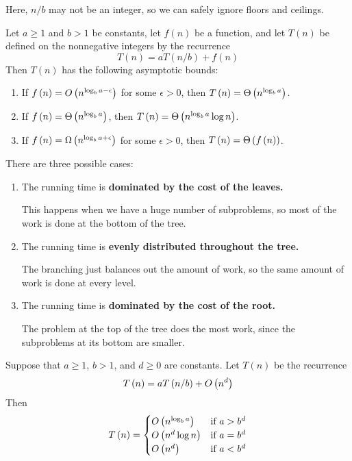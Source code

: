 Here, $n/b$ may not be an integer, so we can safely ignore floors and ceilings.

\begin{theorem}
Let $a \ge 1$ and $b>1$ be constants, let $f\left(n\right)$ be a function, and let $T\left(n\right)$ be defined on the nonnegative integers by the recurrence
\[
    T\left(n\right) = a T\left(n/b\right) + f\left(n\right)
\]
Then $T\left(n\right)$ has the following asymptotic bounds:
\begin{enumerate}
    \item If $f\left(n\right) = O\left(n^{\log_b a - \epsilon} \right)$ for some $\epsilon > 0$, then $T\left(n\right) = \Theta\left(n^{\log_b a} \right)$.
    \item If $f\left(n\right) = \Theta\left(n^{\log_b a} \right)$, then $T\left(n\right) = \Theta\left(n^{\log_b a} \log n \right)$.
    \item If $f\left(n\right) = \Omega\left(n^{\log_b a + \epsilon} \right)$ for some $\epsilon > 0$, then $T\left(n\right) = \Theta\left(f\left(n\right) \right)$.
\end{enumerate}
\end{theorem}

There are three possible cases:
\begin{enumerate}
    \item The running time is \textbf{dominated by the cost of the leaves.}
    
    This happens when we have a huge number of subproblems, so most of the work is done at the bottom of the tree.
    
    \item The running time is \textbf{evenly distributed throughout the tree.}
    
    The branching just balances out the amount of work, so the same amount of work is done at every level.
    
    \item The running time is \textbf{dominated by the cost of the root.}
    
    The problem at the top of the tree does the most work, since the subproblems at its bottom are smaller.

\end{enumerate}

\begin{theorem}
Suppose that $a \ge 1$, $b > 1$, and $d \ge 0$ are constants. Let $T\left(n\right)$ be the recurrence
\[
    T\left(n\right) = a T\left(n/b\right) + O\left(n^d \right)
\]
Then
\[
    T\left(n\right) = \begin{cases}
        O\left(n^{\log_b a} \right) & \text{if $a > b^d$} \\
        O\left(n^d \log n \right) & \text{if $a = b^d$} \\
        O\left(n^d \right) & \text{if $a < b^d$}
    \end{cases}
\]
\end{theorem}

